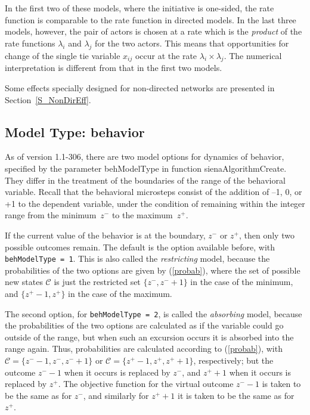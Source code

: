 \documentclass[a4paper,fleqn,11pt]{article}
\newcommand{\+}{\, + \,}
\newcommand{\sfn}[1]{\textsf{#1}}
\begin{document}
In the first two of these models, where the initiative is one-sided,
the rate function is comparable to the rate function in directed models.
In the last three models, however, the pair of actors is chosen at a rate
which is the \emph{product} of the rate functions
$\lambda_i$ and $\lambda_j$ for the two actors.
This means that opportunities for change of the single tie variable $x_{ij}$
occur at the rate $\lambda_i \times \lambda_j$.
The numerical interpretation is different from that in the first two models.

Some effects specially designed for non-directed networks
are presented in Section~\ref{S_NonDirEff}.

\subsection{Model Type: behavior}
\label{S_modeltype_beh}

As of version 1.1-306, there are two model options for dynamics
of behavior, specified by the parameter \sfn{behModelType} in function
\sfn{sienaAlgorithmCreate}.
They differ in the treatment of the boundaries of the range of
the behavioral variable.
Recall that the behavioral microsteps consist of the addition
of --1, 0, or +1 to the dependent variable, under the condition
of remaining within the integer range from the minimum~$z^-$ to
the maximum~$z^+$.

If the current value of the behavior is at the boundary,
$z^-$ or $z^+$, then only two possible outcomes remain.
The default is the option available before, with
\texttt{behModelType = 1}. This is also called the \emph{restricting}
model, because the probabilities of the two options are given by
(\ref{probab}), where the set of possible new states
$\mathcal C$ is just the restricted set $\{z^-, z^-+1\}$ in the case
of the minimum, and $\{z^+-1, z^+\}$ in the case of the maximum.

The second option, for
\texttt{behModelType = 2}, is called the \emph{absorbing}
model, because the probabilities of the two options are calculated
as if the variable could go outside of the range, but when such an excursion
occurs it is absorbed into the range again.
Thus, probabilities are calculated according to
(\ref{probab}), with
$\mathcal C = \{z^--1, z^-, z^-+1\}$ or
$\mathcal C = \{z^+-1, z^+, z^++1\}$,
respectively; but the outcome $z^--1$ when it occurs is replaced
by $z^-$, and  $z^++1$ when it occurs is replaced
by $z^+$.
The objective function for the virtual outcome $z^--1$
is taken to be the same as for $z^-$, and similarly for $z^++1$
it is taken to be the same as for $z^+$.
\end{document}
